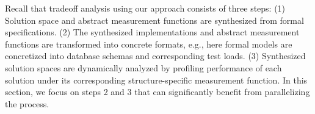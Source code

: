 \documentclass{sig-alternate}
\begin{document}





Recall that tradeoff analysis using our approach consists of three steps: (1) Solution space and abstract measurement functions are synthesized from formal specifications. (2) The synthesized implementations and abstract measurement functions are transformed into concrete formats, e.g., here formal models are concretized into database schemas and corresponding test loads. (3) Synthesized solution spaces are dynamically analyzed by profiling performance of each solution under its corresponding structure-specific measurement function. In this section, we focus on steps 2 and 3 that can significantly benefit from parallelizing the process.
\end{document}
